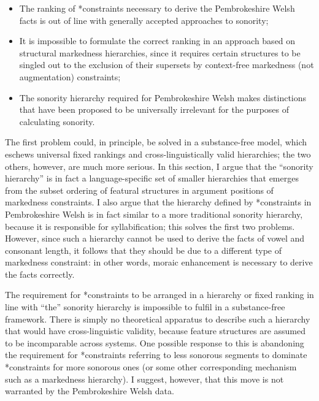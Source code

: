 \begin{itemize}
\item The ranking of *\mo constraints necessary to derive the Pembrokeshire Welsh facts is out of line with generally accepted approaches to sonority;
\item It is impossible to formulate the correct ranking in an approach based on structural markedness hierarchies, since it requires certain structures to be singled out to the exclusion of their supersets by context\hyp free markedness (\ie not augmentation) constraints;
\item The sonority hierarchy required for Pembrokeshire Welsh makes distinctions that have been proposed to be universally irrelevant for the purposes of calculating sonority.
\end{itemize}

The first problem could, in principle, be solved in a substance\hyp free model, which eschews universal fixed rankings and cross\hyp linguistically valid hierarchies; the two others, however, are much more serious. In this section, I argue that the \enquote{sonority hierarchy} is in fact a language\hyp specific set of smaller hierarchies that emerges from the subset ordering of featural structures in argument positions of markedness constraints. I also argue that the hierarchy defined by *\mo[F] constraints in Pembrokeshire Welsh is in fact similar to a more traditional sonority hierarchy, because it is responsible for syllabification; this solves the first two problems. However, since such a hierarchy cannot be used to derive the facts of vowel and consonant length, it follows that they should be due to a different type of markedness constraint: in other words, moraic enhancement is necessary to derive the facts correctly.

The requirement for *\mo[F] constraints to be arranged in a hierarchy or fixed ranking in line with \enquote{the} sonority hierarchy is impossible to fulfil in a substance\hyp free framework. There is simply no theoretical apparatus to describe such a hierarchy that would have cross\hyp linguistic validity, because feature structures are assumed to be incomparable across systems. One possible response to this is abandoning the requirement for *\mo constraints referring to less sonorous segments to dominate *\mo constraints for more sonorous ones (or some other corresponding mechanism such as a markedness hierarchy). I suggest, however, that this move is not warranted by the Pembrokeshire Welsh data.

